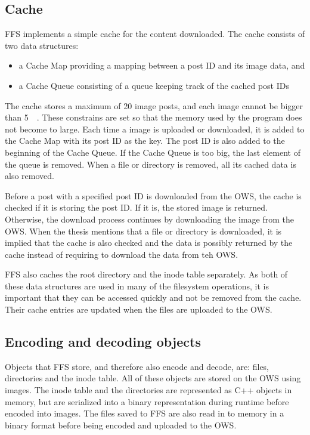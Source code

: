 \subsection{Cache}
FFS implements a simple cache for the content downloaded. The cache consists of two data structures: 
\begin{itemize}
	\item a Cache Map providing a mapping between a post ID and its image data, and
	\item a Cache Queue consisting of a queue keeping track of the cached post IDs
\end{itemize}
The cache stores a maximum of 20 image posts, and each image cannot be bigger than \SI{5}{\mega\byte}. These constrains are set so that the memory used by the program does not become to large. Each time a image is uploaded or downloaded, it is added to the Cache Map with its post ID as the key. The post ID is also added to the beginning of the Cache Queue. If the Cache Queue is too big, the last element of the queue is removed. When a file or directory is removed, all its cached data is also removed.

Before a post with a specified post ID is downloaded from the OWS, the cache is checked if it is storing the post ID. If it is, the stored image is returned. Otherwise, the download process continues by downloading the image from the OWS. When the thesis mentions that a file or directory is downloaded, it is implied that the cache is also checked and the data is possibly returned by the cache instead of requiring to download the data from teh OWS.

FFS also caches the root directory and the inode table separately. As both of these data structures are used in many of the filesystem operations, it is important that they can be accessed quickly and not be removed from the cache. Their cache entries are updated when the files are uploaded to the OWS.

\subsection{Encoding and decoding objects}
\label{subsec:file_enc_dec}
Objects that FFS store, and therefore also encode and decode, are: files, directories and the inode table. All of these objects are stored on the OWS using images. The inode table and the directories are represented as C++ objects in memory, but are serialized into a binary representation during runtime before encoded into images. The files saved to FFS are also read in to memory in a binary format before being encoded and uploaded to the OWS.

